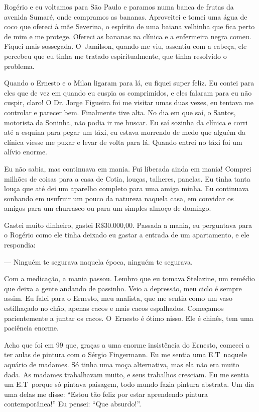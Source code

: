 Rogério e eu voltamos para São Paulo e paramos numa banca de frutas da
avenida Sumaré, onde compramos as bananas. Aproveitei e tomei uma água
de coco que ofereci à mãe Severina, o espírito de uma baiana velhinha
que fica perto de mim e me protege. Ofereci as bananas na clínica e a
enfermeira negra comeu. Fiquei mais sossegada. O~Jamilson, quando me
viu, assentiu com a cabeça, ele percebeu que eu tinha me tratado
espiritualmente, que tinha resolvido o problema.

Quando o Ernesto e o Milan ligaram para lá, eu fiquei super feliz. Eu
contei para eles que de vez em quando eu cuspia os comprimidos, e eles
falaram para eu não cuspir, claro! O Dr. Jorge Figueira foi me visitar
umas duas vezes, eu tentava me controlar e parecer bem. Finalmente tive
alta. No dia em que saí, o Santos, motorista da Soninha, não podia ir me
buscar. Eu saí sozinha da clínica e corri até a esquina para pegar um
táxi, eu estava morrendo de medo que alguém da clínica viesse me puxar e
levar de volta para lá. Quando entrei no táxi foi um alívio enorme.

Eu não sabia, mas continuava em mania. Fui liberada ainda em mania!
Comprei milhões de coisas para a casa de Cotia, louças, talheres,
panelas. Eu tinha tanta louça que até dei um aparelho completo para
uma amiga minha. Eu continuava sonhando em usufruir um pouco da natureza
naquela casa, em convidar os amigos para um churrasco ou para um simples
almoço de domingo.

Gastei muito dinheiro, gastei R\$30.000,00. Passada a mania, eu
perguntava para o Rogério como ele tinha deixado eu gastar a entrada de
um apartamento, e ele respondia:

--- Ninguém te segurava naquela época, ninguém te segurava.

Com a medicação, a mania passou. Lembro que eu tomava Stelazine, um
remédio que deixa a gente andando de passinho. Veio a depressão, meu
ciclo é sempre assim. Eu falei para o Ernesto, meu analista, que me
sentia como um vaso estilhaçado no chão, apenas cacos e mais cacos
espalhados. Começamos pacientemente a juntar os cacos. O~Ernesto é ótimo
nisso. Ele é chinês, tem uma paciência enorme.

Acho que foi em 99 que, graças a uma enorme insistência do Ernesto,
comecei a ter aulas de pintura com o Sérgio Fingermann. Eu me sentia uma
E.T\ naquele aquário de madames. Só tinha uma moça alternativa, mas ela
não era muito dada. As madames trabalhavam muito, e seus trabalhos
cresciam. Eu me sentia um E.T\, porque só pintava paisagem, todo mundo
fazia pintura abstrata. Um dia uma delas me disse: ``Estou tão feliz por
estar aprendendo pintura contemporânea!'' Eu pensei: ``Que absurdo!''.

